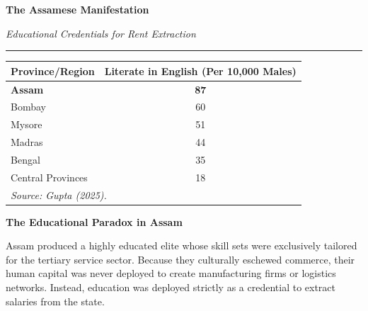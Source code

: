\documentclass[aspectratio=169, 10pt]{beamer}
\newcommand{\slidetitlesub}[2]{%
  \vspace{-4pt}%
  {\usebeamerfont{frametitle}\Large\color{ink}\textbf{#1}}%
  \par\vspace{1pt}%
  {\small\color{slate}\textit{#2}}%
  \par\vspace{2pt}%
  {\color{clay}\rule{40pt}{2pt}}%
  \par\vspace{8pt}%
}
\newcommand{\thesisbox}[2]{%
  \begin{minipage}{\textwidth}
    {\bfseries\color{rust}#1}\par\vspace{4pt}%
    \color{ink}#2
  \end{minipage}\par
}
\begin{document}
\begin{frame}
\slidetitlesub{The Assamese Manifestation}{Educational Credentials for Rent Extraction}

\begin{small}
\begin{center}
\begin{tabular}{lc}
\toprule
\textbf{Province/Region} & \textbf{Literate in English (Per 10,000 Males)} \\
\midrule
\textbf{Assam} & \textbf{87} \\
Bombay & 60 \\
Mysore & 51 \\
Madras & 44 \\
Bengal & 35 \\
Central Provinces & 18 \\
\bottomrule
\multicolumn{2}{l}{\small\textit{Source: Gupta (2025).}} \\
\end{tabular}
\end{center}
\end{small}

\vspace{11pt}
\thesisbox{The Educational Paradox in Assam}{%
  Assam produced a highly educated elite whose skill sets were exclusively tailored for the tertiary service sector. Because they culturally eschewed commerce, their human capital was never deployed to create manufacturing firms or logistics networks. Instead, education was deployed strictly as a credential to extract salaries from the state.
}
\end{frame}

\end{document}
